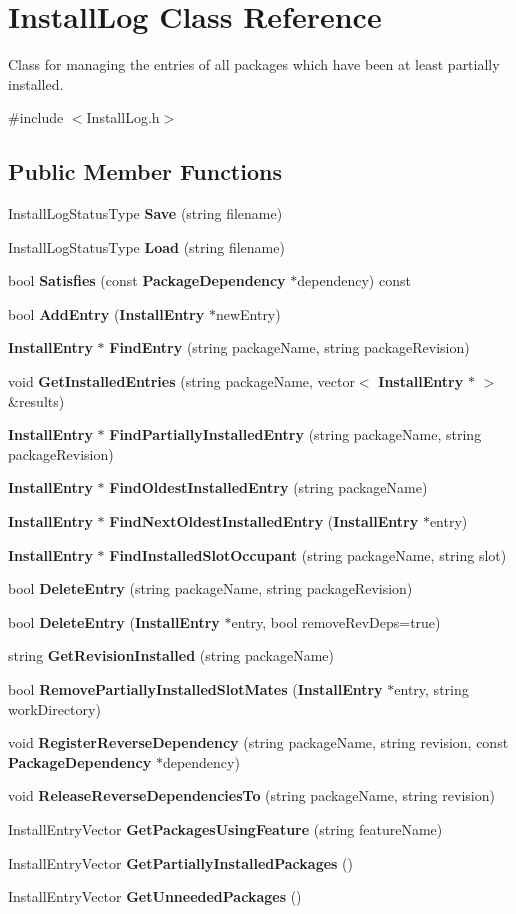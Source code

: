 \section{InstallLog Class Reference}
\label{classInstallLog}


Class for managing the entries of all packages which have been at least partially installed.  




{\ttfamily \#include $<$InstallLog.h$>$}

\subsection*{Public Member Functions}
\begin{DoxyCompactItemize}
\item 
InstallLogStatusType {\bf Save} (string filename)
\item 
InstallLogStatusType {\bf Load} (string filename)
\item 
bool {\bf Satisfies} (const {\bf PackageDependency} $\ast$dependency) const 
\item 
bool {\bf AddEntry} ({\bf InstallEntry} $\ast$newEntry)
\item 
{\bf InstallEntry} $\ast$ {\bf FindEntry} (string packageName, string packageRevision)
\item 
void {\bf GetInstalledEntries} (string packageName, vector$<$ {\bf InstallEntry} $\ast$ $>$ \&results)
\item 
{\bf InstallEntry} $\ast$ {\bf FindPartiallyInstalledEntry} (string packageName, string packageRevision)
\item 
{\bf InstallEntry} $\ast$ {\bf FindOldestInstalledEntry} (string packageName)
\item 
{\bf InstallEntry} $\ast$ {\bf FindNextOldestInstalledEntry} ({\bf InstallEntry} $\ast$entry)
\item 
{\bf InstallEntry} $\ast$ {\bf FindInstalledSlotOccupant} (string packageName, string slot)
\item 
bool {\bf DeleteEntry} (string packageName, string packageRevision)
\item 
bool {\bf DeleteEntry} ({\bf InstallEntry} $\ast$entry, bool removeRevDeps=true)
\item 
string {\bf GetRevisionInstalled} (string packageName)
\item 
bool {\bf RemovePartiallyInstalledSlotMates} ({\bf InstallEntry} $\ast$entry, string workDirectory)
\item 
void {\bf RegisterReverseDependency} (string packageName, string revision, const {\bf PackageDependency} $\ast$dependency)
\item 
void {\bf ReleaseReverseDependenciesTo} (string packageName, string revision)
\item 
InstallEntryVector {\bf GetPackagesUsingFeature} (string featureName)
\item 
InstallEntryVector {\bf GetPartiallyInstalledPackages} ()
\item 
InstallEntryVector {\bf GetUnneededPackages} ()
\end{DoxyCompactItemize}
